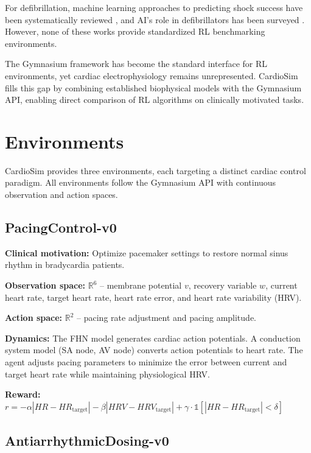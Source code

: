 \documentclass[11pt,a4paper]{article}
\begin{document}
For defibrillation, machine learning approaches to predicting shock success have been systematically reviewed \citep{isasi2020machine}, and AI's role in defibrillators has been surveyed \citep{haddadian2022role, krishnamurti2025ai}. However, none of these works provide standardized RL benchmarking environments.

The Gymnasium framework \citep{towers2024gymnasium, brockman2016openai} has become the standard interface for RL environments, yet cardiac electrophysiology remains unrepresented. CardioSim fills this gap by combining established biophysical models with the Gymnasium API, enabling direct comparison of RL algorithms on clinically motivated tasks.

\section{Environments}

CardioSim provides three environments, each targeting a distinct cardiac control paradigm. All environments follow the Gymnasium API with continuous observation and action spaces.

\subsection{PacingControl-v0}

\textbf{Clinical motivation:} Optimize pacemaker settings to restore normal sinus rhythm in bradycardia patients.

\textbf{Observation space:} $\mathbb{R}^6$ -- membrane potential $v$, recovery variable $w$, current heart rate, target heart rate, heart rate error, and heart rate variability (HRV).

\textbf{Action space:} $\mathbb{R}^2$ -- pacing rate adjustment and pacing amplitude.

\textbf{Dynamics:} The FHN model generates cardiac action potentials. A conduction system model (SA node, AV node) converts action potentials to heart rate. The agent adjusts pacing parameters to minimize the error between current and target heart rate while maintaining physiological HRV.

\textbf{Reward:} $r = -\alpha|HR - HR_{\text{target}}| - \beta|HRV - HRV_{\text{target}}| + \gamma \cdot \mathbb{1}[|HR - HR_{\text{target}}| < \delta]$

\subsection{AntiarrhythmicDosing-v0}
\end{document}
